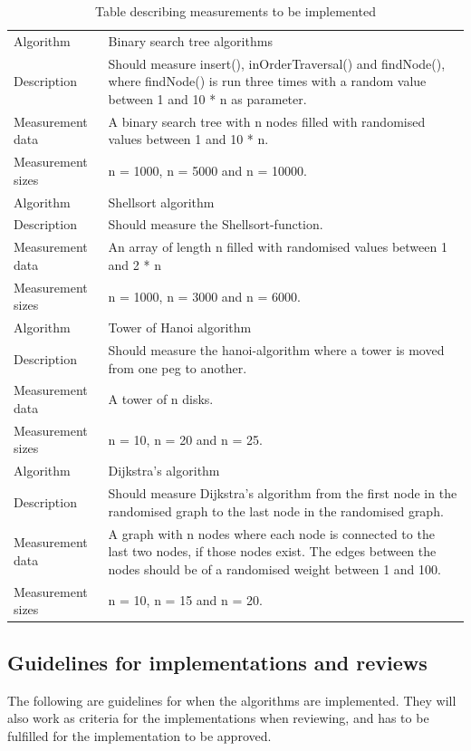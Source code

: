 \documentclass {article}
\begin{document}
\begin{table}[H]
\begin{tabular}{ | l p{10cm} | }
\hline
Algorithm & Binary search tree algorithms \\
Description & Should measure insert(), inOrderTraversal() and findNode(), where findNode() is run three times with a random value between 1 and 10 * n as parameter. \\
Measurement data & A binary search tree with n nodes filled with randomised values between 1 and 10 * n. \\ 
Measurement sizes & n = 1000, n = 5000 and n = 10000. \\
\hline
Algorithm & Shellsort algorithm \\
Description & Should measure the Shellsort-function.\\
Measurement data & An array of length n filled with randomised values between 1 and 2 * n \\ 
Measurement sizes & n = 1000, n = 3000 and n = 6000. \\
\hline
Algorithm & Tower of Hanoi algorithm \\
Description & Should measure the hanoi-algorithm where a tower is moved from one peg to another. \\
Measurement data & A tower of n disks. \\ 
Measurement sizes & n = 10, n = 20 and n = 25. \\
\hline
Algorithm & Dijkstra's algorithm \\
Description & Should measure Dijkstra's algorithm from the first node in the randomised graph to the last node in the randomised graph.\\
Measurement data & A graph with n nodes where each node is connected to the last two nodes, if those nodes exist. The edges between the nodes should be of a randomised weight between 1 and 100.\\ 
Measurement sizes & n = 10, n = 15 and n = 20. \\
\hline
\end{tabular}
\caption{Table describing measurements to be implemented}
\label{tab:measurements}
\end{table}
\subsection{Guidelines for implementations and reviews}
\label{sec:guidelines}
The following are guidelines for when the algorithms are implemented. They will also work as criteria for the implementations when reviewing, and has to be fulfilled for the implementation to be approved.
\label{sec:paradigm-guidelines}
\end{document}
